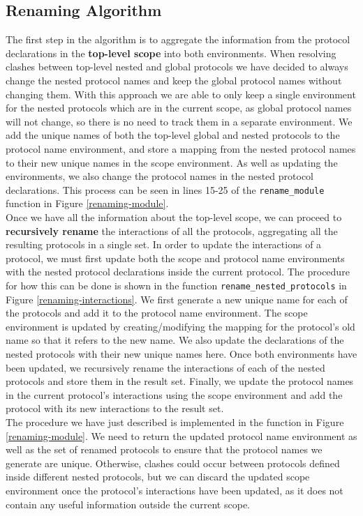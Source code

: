 \documentclass[12pt,twoside]{report}
\begin{document}
\subsection{Renaming Algorithm}

The first step in the algorithm is to aggregate the information from the protocol declarations in the \textbf{top-level scope} into both environments. When resolving clashes between top-level nested and global protocols we have decided to always change the nested protocol names and keep the global protocol names without changing them. With this approach we are able to only keep a single environment for the nested protocols which are in the current scope, as global protocol names will not change, so there is no need to track them in a separate environment. We add the unique names of both the top-level global and nested protocols to the protocol name environment, and store a mapping from the nested protocol names to their new unique names in the scope environment. As well as updating the environments, we also change the protocol names in the nested protocol declarations. This process can be seen in lines 15-25 of the \texttt{rename\_module} function in Figure \ref{renaming-module}.\\

Once we have all the information about the top-level scope, we can proceed to \textbf{recursively rename} the interactions of all the protocols, aggregating all the resulting protocols in a single set. In order to update the interactions of a protocol, we must first update both the scope and protocol name environments with the nested protocol declarations inside the current protocol. The procedure for how this can be done is shown in the function \texttt{rename\_nested\_protocols} in Figure \ref{renaming-interactions}. We first generate a new unique name for each of the protocols and add it to the protocol name environment. The scope environment is updated by creating/modifying the mapping for the protocol's old name so that it refers to the new name. We also update the declarations of the nested protocols with their new unique names here. Once both environments have been updated, we recursively rename the interactions of each of the nested protocols and store them in the result set. Finally, we update the protocol names in the current protocol's interactions using the scope environment and add the protocol with its new interactions to the result set.\\
 
The procedure we have just described is implemented in the \texttt{} function in Figure \ref{renaming-module}. We need to return the updated protocol name environment as well as the set of renamed protocols to ensure that the protocol names we generate are unique. Otherwise, clashes could occur between protocols defined inside different nested protocols, but we can discard the updated scope environment once the protocol's interactions have been updated, as it does not contain any useful information outside the current scope. \\
\end{document}
